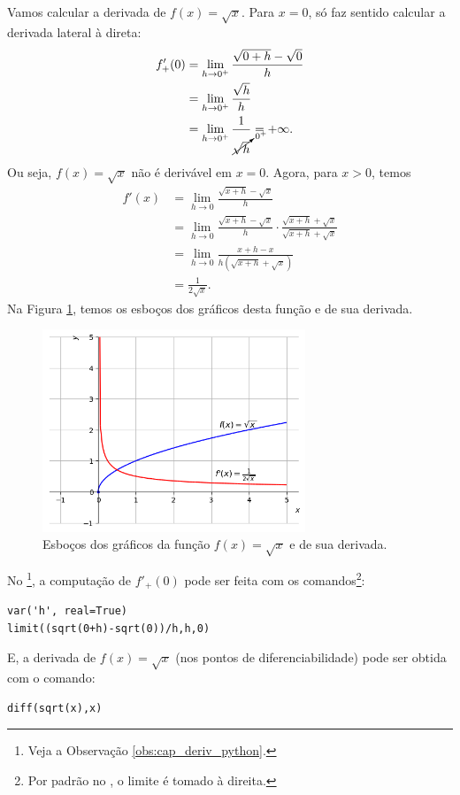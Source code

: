 \begin{ex}\label{ex:deriv_sqrtx}
  Vamos calcular a derivada de $f(x) = \sqrt{x}$. Para $x=0$, só faz sentido calcular a derivada lateral à direta:
  \begin{align}
    f'_{+}(0) &= \lim_{h\to 0^+} \frac{\sqrt{0+h}-\sqrt{0}}{h} \\
              &= \lim_{h\to 0^+} \frac{\sqrt{h}}{h} \\
              &= \lim_{h\to 0^+} \frac{1}{\cancelto{0^+}{\sqrt{h}}} = +\infty.
  \end{align}
  Ou seja, $f(x) = \sqrt{x}$ não é derivável em $x=0$. Agora, para $x> 0$, temos
  \begin{align}
    f'(x) &= \lim_{h\to 0} \frac{\sqrt{x+h}-\sqrt{x}}{h}\\
          &= \lim_{h\to 0} \frac{\sqrt{x+h}-\sqrt{x}}{h}\cdot \frac{\sqrt{x+h}+\sqrt{x}}{\sqrt{x+h}+\sqrt{x}}\\
          &= \lim_{h\to 0} \frac{x+h-x}{h(\sqrt{x+h}+\sqrt{x})}\\
          &= \frac{1}{2\sqrt{x}}.
  \end{align}
  Na Figura \ref{fig:deriv_ex_ffl_sqrtx}, temos os esboços dos gráficos desta função e de sua derivada.

  \begin{figure}[H]
    \centering
    \includegraphics[width=0.7\textwidth]{./cap_deriv/dados/fig_deriv_ex_ffl_sqrtx/fig_deriv_ex_ffl_sqrtx}
    \caption{Esboços dos gráficos da função $f(x)=\sqrt{x}$ e de sua derivada.}
    \label{fig:deriv_ex_ffl_sqrtx}
  \end{figure}

  \ifispython
  No \sympy\footnote{Veja a Observação \ref{obs:cap_deriv_python}.}, a computação de $f'_{+}(0)$ pode ser feita com os comandos\footnote{Por padrão no \sympy, o limite é tomado à direita.}:
\begin{verbatim}
var('h', real=True)
limit((sqrt(0+h)-sqrt(0))/h,h,0)
\end{verbatim}
  E, a derivada de $f(x) = \sqrt{x}$ (nos pontos de diferenciabilidade) pode ser obtida com o comando:
\begin{verbatim}
diff(sqrt(x),x)
\end{verbatim}
  \fi
\end{ex}

